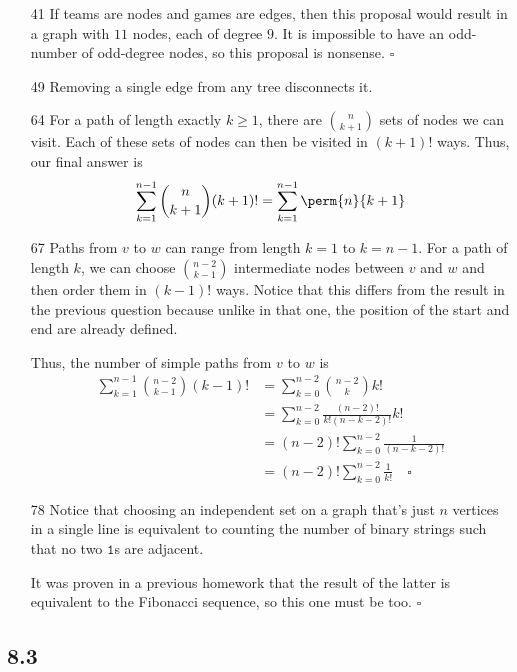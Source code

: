 \documentclass[12pt]{article}
\begin{document}
\begin{enumerate}
    \item[41] If teams are nodes and games are edges,
          then this proposal would result in a graph with $11$ nodes, each of degree $9$.
          It is impossible to have an odd-number of odd-degree nodes,
          so this proposal is nonsense. $\square$
    \item[49] Removing a single edge from any tree disconnects it.
    \item[64] For a path of length exactly $k \ge 1$, there are $\binom{n}{k+1}$ sets of nodes we can visit.
          Each of these sets of nodes can then be visited in $(k+1)!$ ways.
          Thus, our final answer is
          \[\sum_{k=1}^{n-1} \binom{n}{k+1}(k+1)! = \sum_{k=1}^{n-1} \perm{n}{k+1}\]
    \item[67] Paths from $v$ to $w$ can range from length $k=1$ to $k=n-1$.
          For a path of length $k$, we can choose $\binom{n-2}{k-1}$ intermediate nodes between $v$ and $w$
          and then order them in $(k-1)!$ ways.
          Notice that this differs from the result in the previous question because unlike in that one,
          the position of the start and end are already defined.

          Thus, the number of simple paths from $v$ to $w$ is
          \begin{align*}
              \sum_{k=1}^{n-1} \binom{n-2}{k-1}(k-1)! & = \sum_{k=0}^{n-2} \binom{n-2}{k}k!               \\
                                                      & = \sum_{k=0}^{n-2} \frac{(n-2)!}{k!(n-k-2)!}k!    \\
                                                      & = (n-2)!\sum_{k=0}^{n-2} \frac{1}{(n-k-2)!}       \\
                                                      & = (n-2)!\sum_{k=0}^{n-2} \frac{1}{k!}\quad\square
          \end{align*}
    \item[78] Notice that choosing an independent set on a graph that's just $n$ vertices in a single line
          is equivalent to counting the number of binary strings such that no two $\texttt{1}$s are adjacent.

          It was proven in a previous homework that the result of the latter is equivalent to the Fibonacci
          sequence, so this one must be too. $\square$
\end{enumerate}

\subsection*{8.3}\label{sec:8.3}
\end{document}
